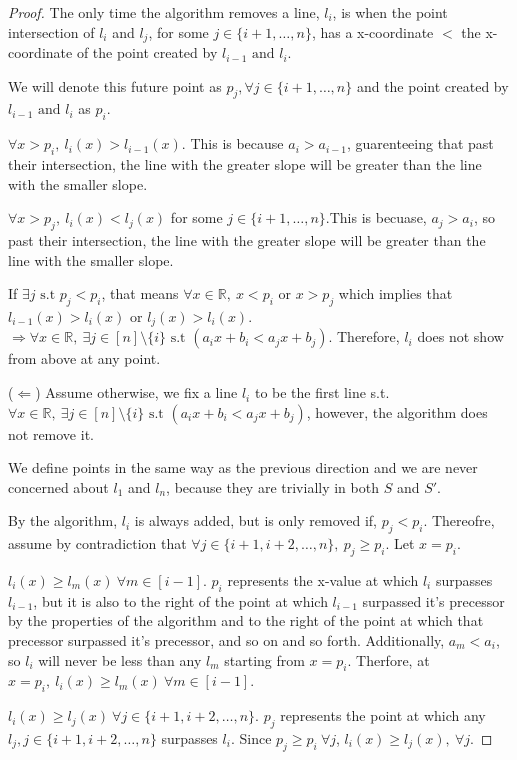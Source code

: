 \documentclass[12pt]{article}
\newcommand{\R}{\mathbb{R}}
\newcommand{\st}{\text{ s.t }}
\newcommand{\tand}{\text{ and }}
\begin{document}
\begin{enumerate}
\begin{proof}
  The only time the algorithm removes a line, $l_i$, is when the point intersection of $l_i$ and $l_j$, for some $j \in \{i+1, \dots, n\}$, has a x-coordinate $<$ the x-coordinate of the point created by $l_{i-1} \tand l_i$. 

  We will denote this future point as $p_j, \forall j \in \{i+1, \dots, n\}$ and the point created by $l_{i-1} \tand l_i$ as $p_i$. 

  $\forall x > p_i, ~l_i(x) > l_{i-1}(x)$. This is because $a_i > a_{i-1}$, guarenteeing that past their intersection, the line with the greater slope will be greater than the line with the smaller slope. 
  
  $\forall x > p_j, ~l_i(x) < l_{j}(x)$ for some $j \in \{i+1, \dots, n\}$.This is becuase, $a_j > a_i$, so past their intersection, the line with the greater slope will be greater than the line with the smaller slope.
  
  If $\exists j \st p_j < p_i$, that means $\forall x \in \R, ~x < p_i$ or  $x > p_j$ which implies that $l_{i-1}(x) > l_i(x)$ or $l_{j}(x) > l_i(x)$. $\Rightarrow \forall x \in \mathbb{R}, ~\exists j \in [n] \setminus \{i\} \st ({a_i}x + b_i < {a_j}x + b_j)$. Therefore, $l_i$ does not show from above at any point.

  ($\Leftarrow$) Assume otherwise, we fix a line $l_i$ to be the first line s.t. $\forall x \in \mathbb{R}, ~\exists j \in [n] \setminus \{i\} \st ({a_i}x + b_i < {a_j}x + b_j)$, however, the algorithm does not remove it. 
  
  We define points in the same way as the previous direction and we are never concerned about $l_1$ and $l_n$, because they are trivially in both $S$ and $S'$.

  By the algorithm, $l_i$ is always added, but is only removed if, $p_j < p_i$. Thereofre, assume by contradiction that $\forall j \in \{i+1, i+2, \dots, n\},~ p_j \geq p_i$.
  Let $x = p_i$.
  
  $l_i(x) \geq l_m(x) ~\forall m \in [i-1]$. $p_i$ represents the x-value at which $l_i$ surpasses $l_{i-1}$, but it is also to the right of the point at which $l_{i-1}$ surpassed it's precessor by the properties of the algorithm and to the right of the point at which that precessor surpassed it's precessor, and so on and so forth. Additionally, $a_m < a_i$, so $l_i$ will never be less than any $l_m$ starting from $x= p_i$. Therfore, at $x= p_i, ~l_i(x) \geq l_m(x) ~\forall m \in [i-1]$.

  $l_i(x) \geq l_j(x) ~\forall j \in \{i+1, i+2, \dots, n\}$. $p_j$ represents the point at which any $l_j, j \in \{i+1, i+2, \dots, n\}$ surpasses $l_i$. Since $p_j \geq p_i ~\forall j$, $l_i(x) \geq l_j(x), ~\forall j$. 
  

\end{proof}
\end{enumerate}
\end{document}
